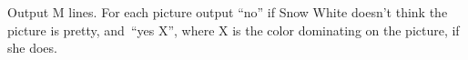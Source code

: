 Output M lines. For each picture output “no” if Snow White doesn't think the picture is pretty, and “yes X”, where X is the color dominating on the picture, if she does.  

\